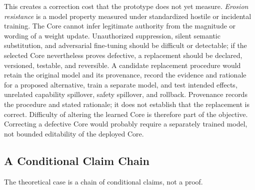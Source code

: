 This creates a correction cost that the prototype does not yet measure.
\emph{Erosion resistance} is a model property measured under standardized
hostile or incidental training. The Core cannot infer legitimate authority from
the magnitude or wording of a weight update. Unauthorized suppression, silent
semantic substitution, and adversarial fine-tuning should be difficult or
detectable; if the selected Core nevertheless proves defective, a replacement
should be declared, versioned, testable, and reversible. A candidate replacement
procedure would retain the original model and its provenance, record the
evidence and rationale for a proposed alternative, train a separate model, and
test intended effects, unrelated capability spillover, safety spillover, and
rollback. Provenance records the procedure and stated rationale; it does not
establish that the replacement is correct. Difficulty of altering the learned
Core is therefore part of the objective. Correcting a defective Core would
probably require a separately trained model, not bounded editability of the
deployed Core.

\subsection{A Conditional Claim Chain}\label{sec:theoretical-basis}

The theoretical case is a chain of conditional claims, not a proof.

